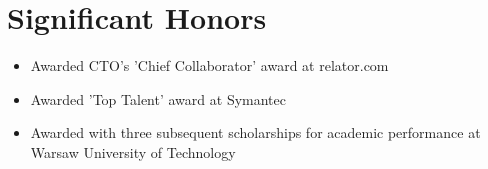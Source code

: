 \documentclass[11pt,a4paper,roman]{moderncv}       %
\begin{document}

\section{Significant Honors}
 
\begin{itemize}
    \item Awarded CTO's 'Chief Collaborator' award at relator.com
    \item Awarded 'Top Talent' award at Symantec
    \item Awarded with three subsequent scholarships for academic performance at Warsaw University of Technology
\end{itemize}

\nocite{*}



\end{document}
